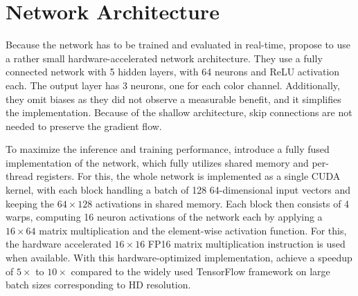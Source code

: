 \section{Network Architecture}
\label{sec:fully_fused}
Because the network has to be trained and evaluated in real-time, \textcite{muller2021} propose to use a rather small hardware-accelerated network architecture.
They use a fully connected network with 5 hidden layers, with 64 neurons and ReLU activation each.
The output layer has 3 neurons, one for each color channel.
Additionally, they omit biases as they did not observe a measurable benefit, and it simplifies the implementation.
Because of the shallow architecture, skip connections are not needed to preserve the gradient flow.

To maximize the inference and training performance, \textcite{muller2021} introduce a fully fused implementation of the network, which fully utilizes shared memory and per-thread registers.
For this, the whole network is implemented as a single CUDA kernel, with each block handling a batch of 128 64-dimensional input vectors and keeping the $64\times128$ activations in shared memory.
Each block then consists of 4 warps, computing 16 neuron activations of the network each by applying a $16\times64$ matrix multiplication and the element-wise activation function.
For this, the hardware accelerated $16\times16$ FP16 matrix multiplication instruction is used when available.
With this hardware-optimized implementation, \textcite{muller2021} achieve a speedup of $5\times$ to $10\times$ compared to the widely used TensorFlow framework \parencite{tensorflowdevelopers2021} on large batch sizes corresponding to HD resolution.

